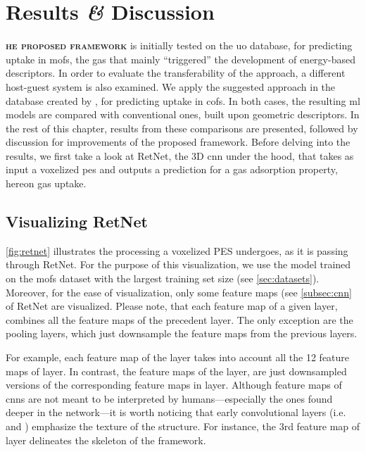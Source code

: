 \chapter{Results \textit{\&} Discussion}

\lettrine[
	nindent=0em, findent=0.5em, loversize=-0.12, lines=5
]{}{\bfseries\color{Blue}he proposed framework} is initially
tested on the \gls{uo} database, for predicting  uptake in \glspl{mof},
the gas that mainly ``triggered'' the development of energy-based
descriptors. In order to evaluate the
transferability of the approach, a different host-guest system is also examined.
We apply the suggested approach in the database created by
\textcite{Mercado_2018}, for predicting  uptake in \glspl{cof}. In both
cases, the resulting \gls{ml} models are compared with conventional ones, built
upon geometric descriptors. In the rest of this
chapter, results from these comparisons are presented, followed by discussion
for improvements of the proposed framework. Before delving into the results, we
first take a look at RetNet, the 3D \gls{cnn} under the hood, that
takes as input a voxelized \gls{pes} and outputs a
prediction for a gas adsorption property, hereon gas
uptake.

\section{Visualizing RetNet}

\Figure{} \ref{fig:retnet} illustrates the processing a voxelized PES undergoes, as
it is passing through RetNet. For the purpose of this visualization, we use the
model trained on the \glspl{mof} dataset with the largest training set size (see
\Section{} \ref{sec:datasets}). Moreover, for the ease of visualization, only some
feature maps (see \Section{} \ref{subsec:cnn} of RetNet are visualized. Please
note, that each feature map of a given layer, combines all
the feature maps of the precedent layer. The only exception are the pooling
layers, which just downsample the feature
maps from the previous layers.

For example, each feature map of the  layer takes into account all the
12 feature maps of  layer. In contrast, the feature maps of the 
layer, are just downsampled versions of the corresponding feature maps in
 layer. Although feature maps of \glspl{cnn} are not meant to be
interpreted by humans---especially the ones found deeper in the network---it is
worth noticing that early convolutional layers (i.e.
 and ) emphasize the texture of the structure. For instance, the
3rd feature map of  layer delineates the skeleton of the framework.

